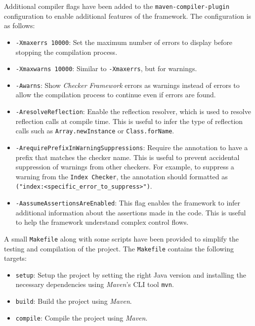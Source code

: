 \documentclass[a4paper, 11pt]{article}
\begin{document}
Additional compiler flags have been added to the \texttt{maven-compiler-plugin} configuration to enable additional features of the framework. The configuration is as follows:

\begin{itemize}
    \item \texttt{-Xmaxerrs 10000}: Set the maximum number of errors to display before stopping the compilation process.

    \item \texttt{-Xmaxwarns 10000}: Similar to \texttt{-Xmaxerrs}, but for warnings.

    \item \texttt{-Awarns}: Show \textit{Checker Framework} errors as warnings instead of errors to allow the compilation process to continue even if errors are found.

    \item \texttt{-AresolveReflection}: Enable the reflection resolver, which is used to resolve reflection calls at compile time. This is useful to infer the type of reflection calls such as \texttt{Array.newInstance} or \texttt{Class.forName}.

    \item \texttt{-ArequirePrefixInWarningSuppressions}: Require the \texttt{\@SuppressWarnings} annotation to have a prefix that matches the checker name. This is useful to prevent accidental suppression of warnings from other checkers. For example, to suppress a warning from the \texttt{Index Checker}, the annotation should formatted as \texttt{\@SuppressWarnings("index:<specific\_error\_to\_suppress>")}.

    \item \texttt{-AassumeAssertionsAreEnabled}: This flag enables the framework to infer additional information about the assertions made in the code. This is useful to help the framework understand complex control flows.
\end{itemize}

A small \texttt{Makefile} along with some scripts have been provided to simplify the testing and compilation of the project. The \texttt{Makefile} contains the following targets:

\begin{itemize}
    \item \texttt{setup}: Setup the project by setting the right Java version and installing the necessary dependencies using \textit{Maven}'s CLI tool \texttt{mvn}.

    \item \texttt{build}: Build the project using \textit{Maven}.

    \item \texttt{compile}: Compile the project using \textit{Maven}.
\end{itemize}
\end{document}
